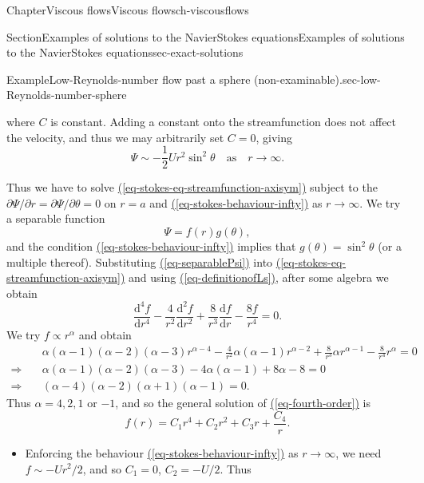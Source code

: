 \documentclass[oneside,10pt,]{book}
\newcommand{\xreffont}{\relax}
\newcommand{\ptxlistdisc}{\raisebox{0.3ex}{\textbullet}}
\numberwithin{equation}{section}
\newcommand{\de}{\mathrm{d}}
\newcommand{\dd}[2]{\frac{\de#1}{\de#2}}
\begin{document}
\begin{chapterptx}{Chapter}{Viscous flows}{}{Viscous flows}{}{}{ch-viscousflows}
\begin{sectionptx}{Section}{Examples of solutions to the Navier\textendash{}Stokes equations}{}{Examples of solutions to the Navier\textendash{}Stokes equations}{}{}{sec-exact-solutions}
\begin{example}{Example}{Low-Reynolds-number flow past a sphere (non-examinable).}{sec-low-Reynolds-number-sphere}
\begin{itemize}[label=\ptxlistdisc]
where \(C\) is constant. Adding a constant onto the streamfunction does not affect the velocity, and thus we may arbitrarily set \(C=0\), giving%
\begin{equation}
\Psi\sim-\frac12Ur^2\sin^2\theta\quad\mathrm{as}\quad r\rightarrow\infty.\label{eq-stokes-behaviour-infty}
\end{equation}
%
\end{itemize}
Thus we have to solve \hyperref[eq-stokes-eq-streamfunction-axisym]{({\xreffont\ref{eq-stokes-eq-streamfunction-axisym}})} subject to the \(\partial\Psi/\partial r=\partial\Psi/\partial\theta=0\) on \(r=a\) and \hyperref[eq-stokes-behaviour-infty]{({\xreffont\ref{eq-stokes-behaviour-infty}})} as \(r\rightarrow\infty\). We try a separable function%
\begin{equation}
\Psi=f(r)g(\theta),\label{eq-separablePsi}
\end{equation}
and the condition \hyperref[eq-stokes-behaviour-infty]{({\xreffont\ref{eq-stokes-behaviour-infty}})} implies that \(g(\theta)=\sin^2\theta\) (or a multiple thereof). Substituting \hyperref[eq-separablePsi]{({\xreffont\ref{eq-separablePsi}})} into \hyperref[eq-stokes-eq-streamfunction-axisym]{({\xreffont\ref{eq-stokes-eq-streamfunction-axisym}})} and using \hyperref[eq-definitionofLs]{({\xreffont\ref{eq-definitionofLs}})}, after some algebra we obtain%
\begin{equation}
\dd{^4f}{r^4}
-\frac{4}{r^2}\dd{^2f}{r^2}
+\frac{8}{r^3}\dd{f}{r}
-\frac{8f}{r^4}
=0.\label{eq-fourth-order}
\end{equation}
We try \(f\propto r^\alpha\) and obtain%
\begin{align*}
&\alpha(\alpha-1)(\alpha-2)(\alpha-3)r^{\alpha-4}
-\frac{4}{r^2}\alpha(\alpha-1)r^{\alpha-2}
+\frac{8}{r^3}\alpha r^{\alpha-1}-\frac{8}{r^4}r^\alpha=0\\
\Rightarrow\quad
&\alpha(\alpha-1)(\alpha-2)(\alpha-3)-4\alpha(\alpha-1)+8\alpha-8=0\\
\Rightarrow\quad
&(\alpha-4)(\alpha-2)(\alpha+1)(\alpha-1)=0.
\end{align*}
Thus \(\alpha=4,2,1\) or \(-1\), and so the general solution of \hyperref[eq-fourth-order]{({\xreffont\ref{eq-fourth-order}})} is%
\begin{equation*}
f(r)=C_1r^4+C_2r^2+C_3r+\frac{C_4}{r}.
\end{equation*}
%
\begin{itemize}[label=\ptxlistdisc]
\item{}Enforcing the behaviour \hyperref[eq-stokes-behaviour-infty]{({\xreffont\ref{eq-stokes-behaviour-infty}})} as \(r\rightarrow\infty\), we need \(f\sim-Ur^2/2\), and so \(C_1=0\), \(C_2=-U/2\). Thus%

\end{itemize}
\end{example}
\end{sectionptx}
\end{chapterptx}
\end{document}
